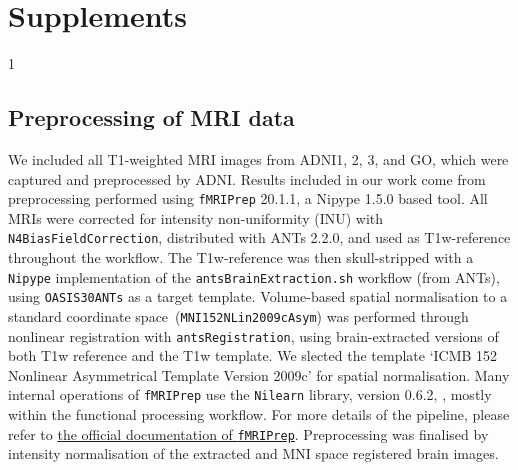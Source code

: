 \documentclass{article}
\begin{document}
\section{Supplements}
1\subsection{Preprocessing of MRI data}\label{apd:preprocessing}
We included all T1-weighted MRI images from ADNI1, 2, 3, and GO, which were captured and
preprocessed by ADNI. Results included in our work come from preprocessing performed using
\texttt{fMRIPrep} 20.1.1, a Nipype 1.5.0 based tool. All MRIs were corrected for intensity
non-uniformity (INU) with \texttt{N4BiasFieldCorrection}, distributed with ANTs 2.2.0, and used as
T1w-reference throughout the workflow. The T1w-reference was then skull-stripped with a
\texttt{Nipype} implementation of the \texttt{antsBrainExtraction.sh} workflow (from ANTs), using
\texttt{OASIS30ANTs} as a target template.
Volume-based spatial normalisation to a standard coordinate space~(\texttt{MNI152NLin2009cAsym}) was
performed through nonlinear registration with \texttt{antsRegistration}, using brain-extracted
versions of both T1w reference and the T1w template. We slected the template `ICMB 152 Nonlinear
Asymmetrical Template Version 2009c' for spatial normalisation.
Many internal operations of \texttt{fMRIPrep} use the
\texttt{Nilearn} library, version 0.6.2, %
, mostly within the functional processing workflow.
For more details of the pipeline, please refer to
\href{https://fMRIPrep.readthedocs.io/en/latest/workflows.html}{the official documentation of
  \texttt{fMRIPrep}}. Preprocessing was finalised by intensity normalisation of the extracted and
MNI space registered brain images.
\end{document}
